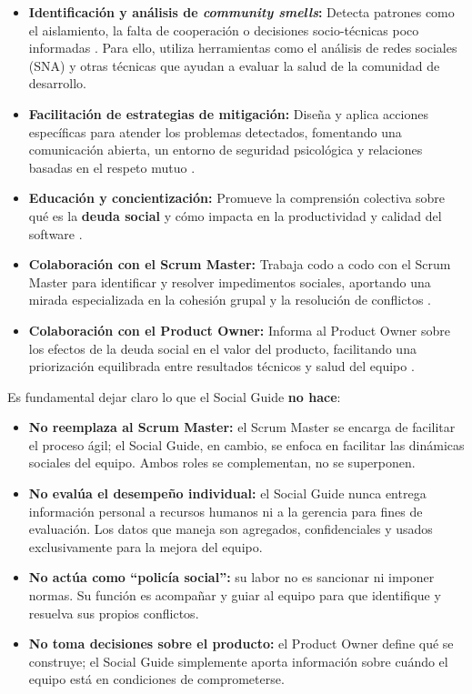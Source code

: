 \begin{itemize}
    \item \textbf{Identificación y análisis de \textit{community smells}:} Detecta patrones como el aislamiento, la falta de cooperación o decisiones socio-técnicas poco informadas \cite{saeeda2024nontechnicaldebt}. Para ello, utiliza herramientas como el análisis de redes sociales (SNA) y otras técnicas que ayudan a evaluar la salud de la comunidad de desarrollo.

    \item \textbf{Facilitación de estrategias de mitigación:} Diseña y aplica acciones específicas para atender los problemas detectados, fomentando una comunicación abierta, un entorno de seguridad psicológica y relaciones basadas en el respeto mutuo \cite{saeeda2024nontechnicaldebt, martini2019agiledebt}.

    \item \textbf{Educación y concientización:} Promueve la comprensión colectiva sobre qué es la \textbf{deuda social} y cómo impacta en la productividad y calidad del software \cite{tamburri2015insights}.

    \item \textbf{Colaboración con el Scrum Master:} Trabaja codo a codo con el Scrum Master para identificar y resolver impedimentos sociales, aportando una mirada especializada en la cohesión grupal y la resolución de conflictos \cite{schwaber2020scrum}.

    \item \textbf{Colaboración con el Product Owner:} Informa al Product Owner sobre los efectos de la deuda social en el valor del producto, facilitando una priorización equilibrada entre resultados técnicos y salud del equipo \cite{saeeda2024nontechnicaldebt, tulili2022burnout}.
\end{itemize}

Es fundamental dejar claro lo que el Social Guide \textbf{no hace}:

\begin{itemize}
    \item \textbf{No reemplaza al Scrum Master:} el Scrum Master se encarga de facilitar el proceso ágil; el Social Guide, en cambio, se enfoca en facilitar las dinámicas sociales del equipo. Ambos roles se complementan, no se superponen.
    \item \textbf{No evalúa el desempeño individual:} el Social Guide nunca entrega información personal a recursos humanos ni a la gerencia para fines de evaluación. Los datos que maneja son agregados, confidenciales y usados exclusivamente para la mejora del equipo.
    \item \textbf{No actúa como ``policía social'':} su labor no es sancionar ni imponer normas. Su función es acompañar y guiar al equipo para que identifique y resuelva sus propios conflictos.
    \item \textbf{No toma decisiones sobre el producto:} el Product Owner define qué se construye; el Social Guide simplemente aporta información sobre cuándo el equipo está en condiciones de comprometerse.
\end{itemize}


